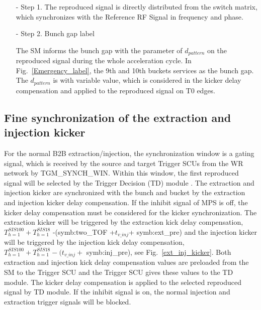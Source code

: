 \begin{itemize}
\begin{itemize}
\item[-] Step 1. The reproduced signal is directly distributed from the switch matrix, which synchronizes with the Reference RF Signal in frequency and phase.
\item[-] Step 2. Bunch gap label

The SM informs the bunch gap with the parameter of $d_{pattern}$ on the reproduced signal during the whole acceleration cycle. In Fig.~\ref{Emergency_label}, the 9th and 10th buckets services as the bunch gap. The $d_{pattern}$ is with variable value, which is considered in the kicker delay compensation and applied to the reproduced signal on T0 edges.

\end{itemize}

\end{itemize}

\subsection{Fine synchronization of the extraction and injection kicker}
For the normal B2B extraction/injection, the synchronization window is a gating signal, which is received by the source and target Trigger SCUs from the WR network by TGM\_SYNCH\_WIN. Within this window, the first reproduced signal will be selected by the Trigger Decision (\gls{TD}) module . The extraction and injection kicker are synchronized with the bunch and bucket by the extraction and injection kicker delay compensation. If the inhibit signal of MPS is off, the kicker delay compensation must be considered for the kicker synchronization. The extraction kicker will be triggered by the extraction kick delay compensation, $T_{h=1}^{SIS100} + T_{h=1}^{SIS18}$ -(\gls{symb:two_TOF} +$ t_{v\_inj}$+ \gls{symb:ext_pre}) and the injection kicker will be triggered by the injection kick delay compensation, $T_{h=1}^{SIS100} + T_{h=1}^{SIS18} - (t_{v\_inj}+$ \gls{symb:inj_pre}), see Fig.~\ref{ext_inj_kicker}. Both extraction and injection kick delay compensation values are preloaded from the SM to the Trigger SCU and the Trigger SCU gives these values to the TD module. The kicker delay compensation is applied to the selected reproduced signal by TD module. If the inhibit signal is on, the normal injection and extraction trigger signals will be blocked.

